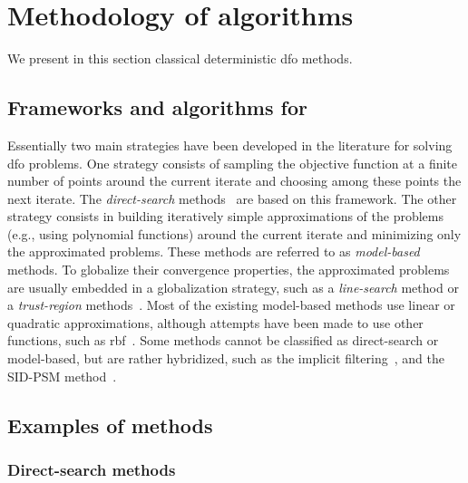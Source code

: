 \section{Methodology of  algorithms}

We present in this section classical deterministic \gls{dfo} methods.

\subsection{Frameworks and algorithms for }

Essentially two main strategies have been developed in the literature for solving \gls{dfo} problems.
One strategy consists of sampling the objective function at a finite number of points around the current iterate and choosing among these points the next iterate.
The \emph{direct-search} methods~\cite{Kolda_Lewis_Torczon_2003} are based on this framework.
The other strategy consists in building iteratively simple approximations of the problems (e.g., using polynomial functions) around the current iterate and minimizing only the approximated problems.
These methods are referred to as \emph{model-based} methods.
To globalize their convergence properties, the approximated problems are usually embedded in a globalization strategy, such as a \emph{line-search} method or a \emph{trust-region} methods~\cite{Conn_Gould_Toint_2000,Yuan_2015}.
Most of the existing model-based methods use linear or quadratic approximations, although attempts have been made to use other functions, such as \gls{rbf}~\cite{Oeuvray_2005}.
Some methods cannot be classified as direct-search or model-based, but are rather hybridized, such as the implicit filtering~\cite{Kelley_2011}, and the SID-PSM method~\cite{Custodio_Rocha_Vicente_2009}.

\subsection{Examples of  methods}

\subsubsection{Direct-search methods}

